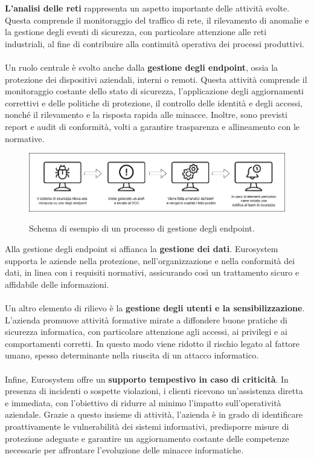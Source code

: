 \textbf{L'analisi delle reti} rappresenta un aspetto importante delle attività svolte. Questa comprende il monitoraggio del traffico di rete, il rilevamento di anomalie e la gestione degli eventi di sicurezza, con particolare attenzione alle reti industriali, al fine di contribuire alla continuità operativa dei processi produttivi.\\\\  
Un ruolo centrale è svolto anche dalla \textbf{gestione degli endpoint}, ossia la protezione dei dispositivi aziendali, interni o remoti. Questa attività comprende il monitoraggio costante dello stato di sicurezza, l'applicazione degli aggiornamenti correttivi e delle politiche di protezione, il controllo delle identità e degli accessi, nonché il rilevamento e la risposta rapida alle minacce. Inoltre, sono previsti report e \gls{audit} di conformità, volti a garantire trasparenza e allineamento con le normative.  
\begin{figure}[H]
    \centering
    \includegraphics[alt={Schema Endpoint governance}, width=\columnwidth]{img/endpoint.png}
    \caption{Schema di esempio di un processo di gestione degli endpoint.}
    \label{fig:endpoint_governance}    
\end{figure}  
Alla gestione degli endpoint si affianca la \textbf{gestione dei dati}. Eurosystem supporta le aziende nella protezione, nell'organizzazione e nella conformità dei dati, in linea con i requisiti normativi, assicurando così un trattamento sicuro e affidabile delle informazioni.\\\\  
Un altro elemento di rilievo è la \textbf{gestione degli utenti e la sensibilizzazione}. L'azienda promuove attività formative mirate a diffondere buone pratiche di sicurezza informatica, con particolare attenzione agli accessi, ai privilegi e ai comportamenti corretti. In questo modo viene ridotto il rischio legato al fattore umano, spesso determinante nella riuscita di un attacco informatico.\\\\  
Infine, Eurosystem offre un \textbf{supporto tempestivo in caso di criticità}. In presenza di incidenti o sospette violazioni, i clienti ricevono un'assistenza diretta e immediata, con l'obiettivo di ridurre al minimo l'impatto sull'operatività aziendale.  
Grazie a questo insieme di attività, l'azienda è in grado di identificare proattivamente le vulnerabilità dei sistemi informativi, predisporre misure di protezione adeguate e garantire un aggiornamento costante delle competenze necessarie per affrontare l'evoluzione delle minacce informatiche.  
